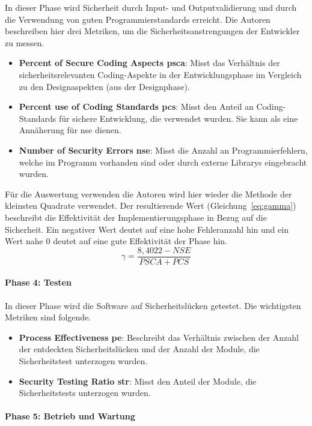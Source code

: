 \documentclass[12pt, a4paper, ngerman]{article}
\begin{document}
In dieser Phase wird Sicherheit durch Input- und Outputvalidierung und durch die Verwendung von guten Programmierstandards erreicht.
Die Autoren beschreiben hier drei Metriken, um die Sicherheitsanstrengungen der Entwickler zu messen.
\begin{itemize}
  \item \textbf{Percent of Secure Coding Aspects \acs{psca}}: Misst das Verhältnis der sicherheitsrelevanten Coding-Aspekte in der Entwicklungsphase im Vergleich zu den Designaspekten (aus der Designphase).
  \item \textbf{Percent use of Coding Standards \acs{pcs}}: Misst den Anteil an Coding-Standards für sichere Entwicklung, die verwendet wurden. Sie kann als eine Annäherung für \ac{nse} dienen.
  \item \textbf{Number of Security Errors \acs{nse}}: Misst die Anzahl an Programmierfehlern, welche im Programm vorhanden sind oder durch externe Librarys eingebracht wurden.
\end{itemize}
Für die Auswertung verwenden die Autoren wird hier wieder die Methode der kleinsten Quadrate verwendet.
Der resultierende Wert \gamma (Gleichung~\ref{eq:gamma}) beschreibt die Effektivität der Implementierungsphase in Bezug auf die Sicherheit.
Ein negativer \gamma Wert deutet auf eine hohe Fehleranzahl hin und ein Wert nahe 0 deutet auf eine gute Effektivität der Phase hin.
\begin{equation} \label{eq:gamma}
  \gamma = \frac{ 8,4022 - NSE }{ PSCA + PCS }
\end{equation}

\paragraph{Phase 4: Testen}

In dieser Phase wird die Software auf Sicherheitslücken getestet.
Die wichtigsten Metriken sind folgende.
\begin{itemize}
  \item \textbf{Process Effectiveness \acs{pe}}: Beschreibt das Verhältnis zwischen der Anzahl der entdeckten Sicherheitslücken und der Anzahl der Module, die Sicherheitstest unterzogen wurden.
  \item \textbf{Security Testing Ratio \acs{str}}: Misst den Anteil der Module, die Sicherheitstests unterzogen wurden.
\end{itemize}

\paragraph{Phase 5: Betrieb und Wartung}
\end{document}
